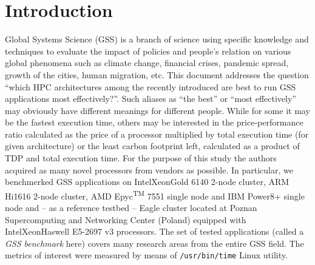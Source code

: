 \section{Introduction}
\label{sec:intro}
Global Systems Science (GSS) is a branch of science using specific knowledge and techniques to evaluate the impact of policies and people's relation on various global phenomena such as climate change, financial crises, pandemic spread, growth of the cities, human migration, etc. This document addresses the question ``which HPC architectures among the recently introduced are best to run GSS applications most effectively?''. Such aliases as ``the best'' or ``most effectively'' may obviously have different meanings for different people. While for some it may be the fastest execution time, others may be interested in the price-performance ratio calculated as the price of a processor multiplied by total execution time (for given architecture) or the least carbon footprint left, calculated as a product of TDP and total execution time.
For the purpose of this study the authors acquired as many novel processors from vendors as possible. In particular, we benchmerked GSS applications on Intel\textregistered Xeon\textregistered Gold 6140 \cite{INTELXEONGOLD6140} 2-node cluster, ARM Hi1616 2-node cluster, AMD Epyc\textsuperscript{TM} 7551 single node and IBM Power8+ \cite{IBMPOWER8} single node and -- as a reference testbed -- Eagle cluster located at Poznan Supercomputing and Networking Center (Poland) equipped with Intel\textregistered  Xeon\textregistered Haswell E5-2697 v3 processors.
The set of tested applications (called a \textit{GSS benchmark} here) covers many research areas from the entire GSS field.
The metrics of interest were measured by means of \texttt{/usr/bin/time} Linux utility.
